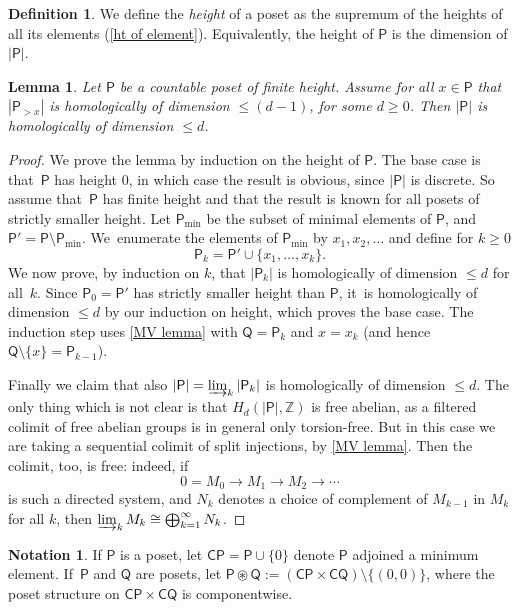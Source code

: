 \documentclass[JEP,XML,SOM,Unicode,NoFloatCountersInSection,published]{cedram}
\theoremstyle{plain}
\newtheorem{lem}[thm]{Lemma}
\theoremstyle{definition}
\newtheorem{defn}[thm]{Definition}
\newtheorem{notation}[thm]{Notation}
\let\altjoin\circledast
\newcommand{\Z}{\mathbb Z}
\newcommand{\Po}{\mathsf{P}}
\begin{document}
\begin{defn}We define the \emph{height} of a poset as the supremum of the heights of all its elements (\cref{ht of element}). Equivalently, the height of $\Po$ is the dimension of $|\Po|$.
\end{defn}

\begin{lem}\label{dimension lemma}
	Let $\Po$ be a countable poset of finite height. Assume for all $x \in \Po$ that $|\Po_{>x}|$ is homologically of dimension $\leq (d-1)$, for some $d \geq 0$. Then $|\Po|$ is homologically of dimension $\leq d$.
\end{lem}

\begin{proof}We prove the lemma by induction on the height of $\Po$. The base case is that~$\Po$ has height $0$, in which case the result is obvious, since $|\Po|$ is discrete. So assume that~$\Po$ has finite height and that the result is known for all posets of strictly smaller height. Let $\Po_{\min}$ be the subset of minimal elements of $\Po$, and $\Po' = \Po \setminus \Po_{\min}$. We~enumerate the elements of $\mathsf P_{\min}$ by $x_1,x_2,\ldots$ and define for $k \geq 0$
\[
\mathsf P_k = \mathsf P' \cup \{x_1,\dots,x_k\}.
\]
We now prove, by induction on $k$, that $|\Po_k|$ is homologically of dimension $\leq d$ for all~$k$. Since $\Po_0=\Po'$ has strictly smaller height than $\Po$, it~is homologically of dimension $\leq d$ by our induction on height, which proves the base case. The induction step uses \cref{MV lemma} with $\mathsf Q= \Po_k$ and $x=x_k$ (and hence $\mathsf Q \setminus \{x\} = \Po_{k-1}$).

Finally we claim that also $|\Po| = \varinjlim_k |\Po_k|$ is homologically of dimension $\leq d$. The only thing which is not clear is that $H_d(|\Po|,\Z)$ is free abelian, as a filtered colimit of free abelian groups is in general only torsion-free. But in this case we are taking a sequential colimit of split injections, by \cref{MV lemma}. Then the colimit, too, is free: indeed, if
\[
0 = M_0 \to M_1 \to M_2 \to \cdots
\]
is such a directed system, and $N_k$ denotes a choice of complement of $M_{k-1}$ in $M_k$ for all $k$, then $\varinjlim_k M_k \cong \bigoplus_{k=1}^\infty N_k$. \end{proof}

\begin{notation}\label{notation:join}If $\Po$ is a poset, let $\mathsf C \Po = \Po \cup \{0\}$ denote $\Po$ adjoined a minimum element. If~$\mathsf P$ and $\mathsf Q$ are posets, let $\mathsf P \altjoin \mathsf Q := (\mathsf{CP} \times \mathsf{CQ}) \setminus \{(0,0)\}$, where the poset structure on $\mathsf{CP} \times \mathsf{CQ}$ is componentwise.
\end{notation}
\end{document}
